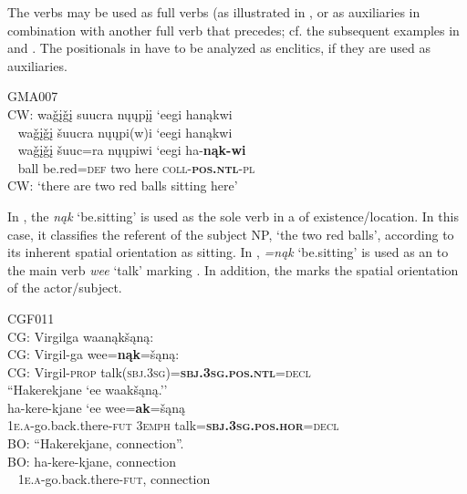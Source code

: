 \documentclass[output=paper]{langsci/langscibook}
\begin{document}
The  verbs may be used as full verbs (as illustrated in , or as auxiliaries in combination with another full verb that precedes; cf. the subsequent examples in  and . The positionals in  have to be analyzed as enclitics, if they are used as auxiliaries.


\ea  \label{ex:helmbrecht:3}
GMA007 \\
\gllll
{\upshape CW:} wa\v{g}į\v{g}į suucra nųųpįį `eegi hanąkwi\\
~ wa\v{g}į\v{g}į šuucra    nųųpi(w)i `eegi hanąkwi\\
~ wa\v{g}į\v{g}į  šuuc=ra  nųųpiwi  `eegi   ha-\textbf{nąk-wi}       \\
~ ball  be.red=\textsc{def}  two      here   \textsc{coll}-\textbf{\textsc{pos.ntl}}-\textsc{pl}\\
\glt CW:   `there are two red balls sitting here'
\z

In , the  \textit{nąk} `be.sitting' is used as the sole verb in a  of existence/location. In this case, it classifies the referent of the subject NP, `the two red balls', according to its inherent spatial orientation as sitting. In , \textit{=nąk} `be.sitting' is used as an  to the main verb \textit{wee} `talk' marking . In addition, the  marks the spatial orientation of the actor/subject. 

 
\ea\label{ex:helmbrecht:4}
CGF011  \\
\glll  CG: Virgilga waanąkšąną: \\
  CG: Virgil-ga          wee=\textbf{nąk}=šąną:\\
  CG: Virgil-\textsc{prop}    talk(\textsc{sbj}.\textsc{3sg})=\textbf{\textsc{sbj}.\textsc{3sg}.\textsc{pos.ntl}}=\textsc{decl}\\
  
\glll ``Hakerekjane `ee waakšąną.''\\
 ha-kere-kjane  `ee      wee=\textbf{ak}=šąną\\  
  \textsc{1e.a}-go.back.there-\textsc{fut}  \textsc{3emph}    talk=\textbf{\textsc{sbj}.\textsc{3sg}.\textsc{pos}.\textsc{hor}}=\textsc{decl}  \\


\glll  BO: ``Hakerekjane, connection''.\\
  BO:  ha-kere-kjane,                connection\\
     ~    \textsc{1e.a}-go.back.there-\textsc{fut}, connection  \\
\end{document}
